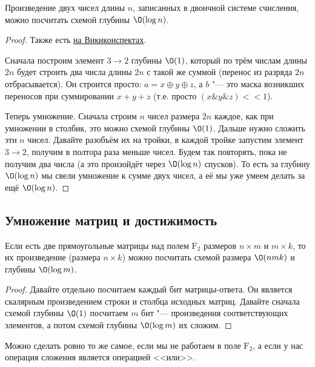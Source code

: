 	\begin{theorem}
		Произведение двух чисел длины $n$, записанных в двоичной системе счисления, можно посчитать схемой глубины $\O(\log n)$.
	\end{theorem}
	\begin{proof}
		Также есть \href{http://neerc.ifmo.ru/wiki/index.php?title=\%D0\%94\%D0\%B5\%D1\%80\%D0\%B5\%D0\%B2\%D0\%BE_\%D0\%A3\%D0\%BE\%D0\%BB\%D0\%BB\%D0\%B5\%D1\%81\%D0\%B0}{на Викиконспектах}.

		Сначала построим элемент $3 \to 2$ глубины $\O(1)$, который по трём числам длины $2n$ будет строить два числа длины $2n$ с такой же суммой (перенос из разряда $2n$ отбрасывается).
		Он строится просто: $a = x \oplus y \oplus z$, а $b$ "--- это маска возникших переносов при суммировании $x+y+z$ (т.е. просто $(x \& y \& z) << 1$).

		Теперь умножение.
		Сначала строим $n$ чисел размера $2n$ каждое, как при умножении в столбик, это можно схемой глубины $\O(1)$.
		Дальше нужно сложить эти $n$ чисел.
		Давайте разобъём их на тройки, в каждой тройке запустим элемент $3 \to 2$, получим в полтора раза меньше чисел.
		Будем так повторять, пока не получим два числа (а это произойдёт через $\O(\log n)$ спусков).
		То есть за глубину $\O(\log n)$ мы свели умножение к сумме двух чисел, а её мы уже умеем делать за ещё $\O(\log n)$.
	\end{proof}

\subsection{Умножение матриц и достижимость}
	\begin{lemma}
		Если есть две прямоугольные матрицы над полем $\mathrm{F}_2$ размеров $n \times m$ и $m \times k$, то их произведение (размера $n \times k$)
		можно посчитать схемой размера $\O(nmk)$ и глубины $\O(\log m)$.
	\end{lemma}
	\begin{proof}
		Давайте отдельно посчитаем каждый бит матрицы-ответа.
		Он является скалярным произведением строки и столбца исходных матриц.
		Давайте сначала схемой глубины $\O(1)$ посчитаем $m$ бит "--- произведения соответствующих элементов, а потом схемой глубины $\O(\log m)$ их сложим.
	\end{proof}
	\begin{Rem}
		Можно сделать ровно то же самое, если мы не работаем в поле $\mathrm{F}_2$, а если у нас операция сложения является операцией <<или>>.
	\end{Rem}


